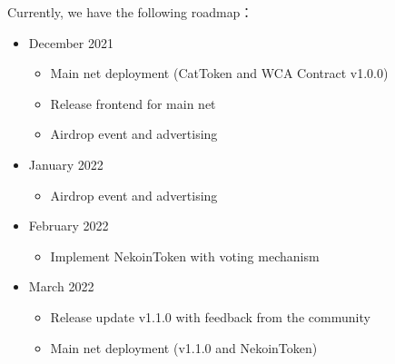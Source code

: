 Currently, we have the following roadmap：

\begin{itemize}
    \item December 2021
    \begin{itemize}
        \item Main net deployment (CatToken and WCA Contract v1.0.0)
        \item Release frontend for main net
        \item Airdrop event and advertising
    \end{itemize}

    \item January 2022
    \begin{itemize}
        \item Airdrop event and advertising
    \end{itemize}

    \item February 2022
    \begin{itemize}
        \item Implement NekoinToken with voting mechanism
    \end{itemize}

    \item March 2022
    \begin{itemize}
        \item Release update v1.1.0 with feedback from the community
        \item Main net deployment (v1.1.0 and NekoinToken)
    \end{itemize}
\end{itemize}
